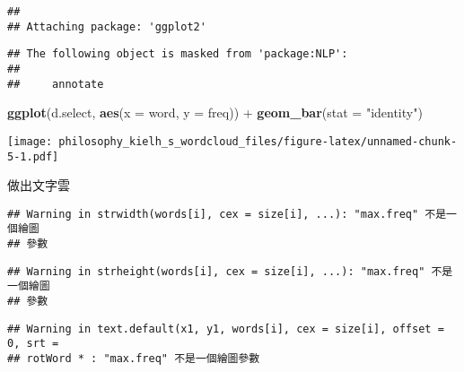 \documentclass[]{article}
\newenvironment{Shaded}{\begin{snugshade}}{\end{snugshade}}
\newcommand{\KeywordTok}[1]{\textcolor[rgb]{0.13,0.29,0.53}{\textbf{{#1}}}}
\newcommand{\DataTypeTok}[1]{\textcolor[rgb]{0.13,0.29,0.53}{{#1}}}
\newcommand{\DecValTok}[1]{\textcolor[rgb]{0.00,0.00,0.81}{{#1}}}
\newcommand{\FloatTok}[1]{\textcolor[rgb]{0.00,0.00,0.81}{{#1}}}
\newcommand{\StringTok}[1]{\textcolor[rgb]{0.31,0.60,0.02}{{#1}}}
\newcommand{\OtherTok}[1]{\textcolor[rgb]{0.56,0.35,0.01}{{#1}}}
\newcommand{\NormalTok}[1]{{#1}}
\begin{document}
\begin{verbatim}
## 
## Attaching package: 'ggplot2'
\end{verbatim}

\begin{verbatim}
## The following object is masked from 'package:NLP':
## 
##     annotate
\end{verbatim}

\begin{Shaded}
\begin{Highlighting}[]
\KeywordTok{ggplot}\NormalTok{(d.select, }\KeywordTok{aes}\NormalTok{(}\DataTypeTok{x =} \NormalTok{word, }\DataTypeTok{y =} \NormalTok{freq)) +}\StringTok{ }\KeywordTok{geom_bar}\NormalTok{(}\DataTypeTok{stat =} \StringTok{"identity"}\NormalTok{)}
\end{Highlighting}
\end{Shaded}

\texttt{[image: philosophy\_kielh\_s\_wordcloud\_files/figure-latex/unnamed-chunk-5-1.pdf]}

做出文字雲

\begin{Shaded}
\end{Shaded}

\begin{verbatim}
## Warning in strwidth(words[i], cex = size[i], ...): "max.freq" 不是一個繪圖
## 參數
\end{verbatim}

\begin{verbatim}
## Warning in strheight(words[i], cex = size[i], ...): "max.freq" 不是一個繪圖
## 參數
\end{verbatim}

\begin{verbatim}
## Warning in text.default(x1, y1, words[i], cex = size[i], offset = 0, srt =
## rotWord * : "max.freq" 不是一個繪圖參數
\end{verbatim}
\end{document}
